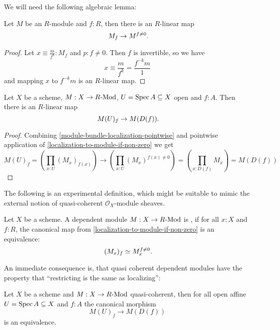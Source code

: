 We will need the following algebraic lemma:

\begin{lemma}%
  \label{localization-to-module-if-non-zero}
  Let $M$ be an $R$-module and $f:R$,
  then there is an $R$-linear map
  \[
    M_f\to M^{f\neq 0}
    \rlap{.}
  \]
\end{lemma}

\begin{proof}
  Let $x\equiv \frac{m}{f^k}:M_f$ and $p:f\neq 0$.
  Then $f$ is invertible, so we have
  \[
    x\equiv \frac{m}{f^k}=\frac{f^{-k}m}{1}
  \]
  and mapping $x$ to $f^{-k}m$ is an $R$-linear map.
  
\end{proof}

\begin{lemma}%
  \label{localization-to-restriction}                    
  Let $X$ be a scheme, $M:X\to R\text{-}\mathrm{Mod}$, $U=\operatorname{Spec} A\subseteq X$ open and $f:A$.
  Then there is an $R$-linear map
  \[
    M(U)_f \to M(D(f)) 
    \rlap{.}
  \]
\end{lemma}

\begin{proof}
  Combining \cref{module-bundle-localization-pointwise}
  and pointwise application of \cref{localization-to-module-if-non-zero} we get
  \[
    M(U)_f=\left(\prod_{x:U}(M_x)_{f(x)}\right)\to \left(\prod_{x:U}(M_x)^{f(x)\neq 0}\right)
    =\left(\prod_{x:D(f)}M_x\right)
    =M(D(f))
  \]
\end{proof}

The following is an experimental definition,
which might be suitable
to mimic the external notion of quasi-coherent $\mathcal O_X$-module sheaves.

\begin{definition}%
  \label{quasi-coherent-bundle}
  Let $X$ be a scheme.
  A dependent module $M:X\to R\text{-}\mathrm{Mod}$ is ,
  if for all $x:X$ and $f:R$,
  the canonical map from \cref{localization-to-module-if-non-zero} is an equivalence:
  \[
    (M_x)_f\simeq M_x^{f\neq 0}
    \rlap{.}
  \]
\end{definition}

An immediate consequence is, that
quasi coherent dependent modules have
the property that ``restricting is the same as localizing'':

\begin{lemma}
  Let $X$ be a scheme and $M:X\to R\text{-}\mathrm{Mod}$ quasi-coherent,
  then for all open affine $U=\operatorname{Spec} A\subseteq X$ and $f:A$
  the canonical morphism
  \[
    M(U)_f\to M(D(f))
  \]
  is an equivalence.
\end{lemma}

